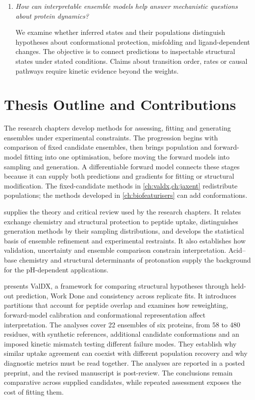 \begin{enumerate}
    \item \textit{How can interpretable ensemble models help answer mechanistic questions about protein dynamics?}

    We examine whether inferred states and their populations distinguish hypotheses about conformational protection, misfolding and ligand-dependent changes. The objective is to connect predictions to inspectable structural states under stated conditions. Claims about transition order, rates or causal pathways require kinetic evidence beyond the weights.
\end{enumerate}

\section{Thesis Outline and Contributions}
\label{sec:intro-outline}

The research chapters develop methods for assessing, fitting and generating ensembles under experimental constraints. The progression begins with comparison of fixed candidate ensembles, then brings population and forward-model fitting into one optimisation, before moving the forward models into sampling and generation. A differentiable forward model connects these stages because it can supply both predictions and gradients for fitting or structural modification. The fixed-candidate methods in \cref{ch:valdx,ch:jaxent} redistribute populations; the methods developed in \cref{ch:biofeaturisers} can add conformations.

 supplies the theory and critical review used by the research chapters. It relates exchange chemistry and structural protection to peptide uptake, distinguishes generation methods by their sampling distributions, and develops the statistical basis of ensemble refinement and experimental restraints. It also establishes how validation, uncertainty and ensemble comparison constrain interpretation. Acid--base chemistry and structural determinants of protonation supply the background for the pH-dependent applications.

 presents ValDX, a framework for comparing structural hypotheses through held-out prediction, Work Done and consistency across replicate fits. It introduces partitions that account for peptide overlap and examines how reweighting, forward-model calibration and conformational representation affect interpretation. The analyses cover 22 ensembles of six proteins, from 58 to 480 residues, with synthetic references, additional candidate conformations and an imposed kinetic mismatch testing different failure modes. They establish why similar uptake agreement can coexist with different population recovery and why diagnostic metrics must be read together. The analyses are reported in a posted preprint,\supercite{siddiquiFrameworkTestingStructural2026} and the revised manuscript is post-review. The conclusions remain comparative across supplied candidates, while repeated assessment exposes the cost of fitting them.

